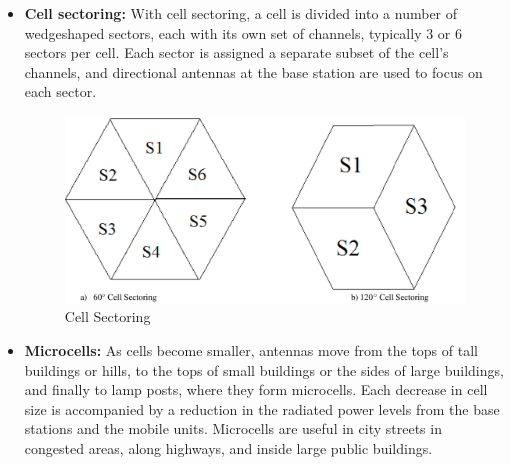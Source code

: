 {\begin{itemize}
\begin{figure}[h]
            \caption{Cell Spliting}
        \end{figure}
        \item \textbf{Cell sectoring:} With cell sectoring, a cell is divided into a 
        number of wedgeshaped sectors, each with its own set of channels, typically 
        3 or 6 sectors per cell. Each sector is assigned a separate subset of the 
        cell’s channels, and directional antennas at the base station are used 
        to focus on each sector.
        \begin{figure}[h]
            \centering
            \includegraphics[scale=0.15]{img/sector.png}
            \caption{Cell Sectoring}
        \end{figure}
        \item \textbf{Microcells:} As cells become smaller, antennas move from the 
        tops of tall buildings or hills, to the tops of small buildings or the 
        sides of large buildings, and finally to lamp posts, where they form 
        microcells. Each decrease in cell size is accompanied by a reduction 
        in the radiated power levels from the base stations and the mobile units. 
        Microcells are useful in city streets in congested areas, along highways, 
        and inside large public buildings.
    \end{itemize}
}
    
